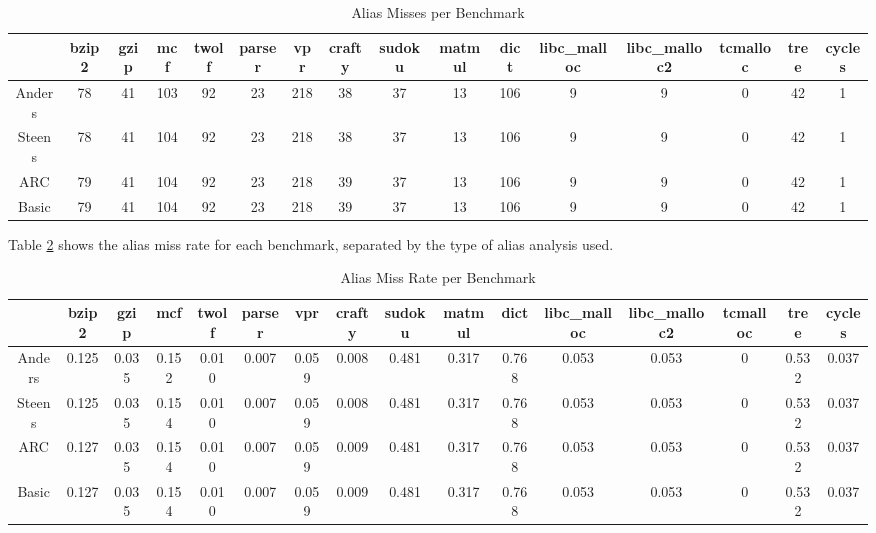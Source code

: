 \begin{table} [h!]
\centering
   \begin{tabular} {|c|c c c c c c c c c c c c c c c|}
      \hline
      & bzip2 & gzip & mcf & twolf & parser & vpr & crafty & sudoku & matmul & dict & libc\_malloc & libc\_malloc2 & tcmalloc & tree & cycles \\
      \hline
      Anders & 78 & 41 & 103 & 92 & 23 & 218 & 38 & 37 & 13 & 106 & 9 & 9 & 0 & 42 & 1\\
      \hline
      Steens & 78 & 41 & 104 & 92 & 23 & 218 & 38 & 37 & 13 & 106 & 9 & 9 & 0 & 42 & 1\\
      \hline
      ARC & 79 & 41 & 104 & 92 & 23 & 218 & 39 & 37 & 13 & 106 & 9 & 9 & 0 & 42 & 1\\
      \hline
      Basic & 79 & 41 & 104 & 92 & 23 & 218 & 39 & 37 & 13 & 106 & 9 & 9 & 0 & 42 & 1\\
      \hline
   \end{tabular}
   \caption{Alias Misses per Benchmark}
   \label{table:2}
\end{table}

Table \ref{table:3} shows the alias miss rate for each benchmark, separated by the type of alias analysis used.

\begin{table} [h!]
\centering
   \begin{tabular} {|c|c c c c c c c c c c c c c c c|}
      \hline
      & bzip2 & gzip & mcf & twolf & parser & vpr & crafty & sudoku & matmul & dict & libc\_malloc & libc\_malloc2 & tcmalloc & tree & cycles \\
      \hline
      Anders & 0.125 & 0.035 & 0.152 & 0.010 & 0.007 & 0.059 & 0.008 & 0.481 & 0.317 & 0.768 & 0.053 & 0.053 & 0 & 0.532 & 0.037 \\
      \hline
      Steens & 0.125 & 0.035 & 0.154 & 0.010 & 0.007 & 0.059 & 0.008 & 0.481 & 0.317 & 0.768 & 0.053 & 0.053 & 0 & 0.532 & 0.037 \\
      \hline
      ARC & 0.127 & 0.035 & 0.154 & 0.010 & 0.007 & 0.059 & 0.009 & 0.481 & 0.317 & 0.768 & 0.053 & 0.053 & 0 & 0.532 & 0.037 \\
      \hline
      Basic & 0.127 & 0.035 & 0.154 & 0.010 & 0.007 & 0.059 & 0.009 & 0.481 & 0.317 & 0.768 & 0.053 & 0.053 & 0 & 0.532 & 0.037 \\
      \hline
   \end{tabular}
   \caption{Alias Miss Rate per Benchmark}
   \label{table:3}
\end{table}

